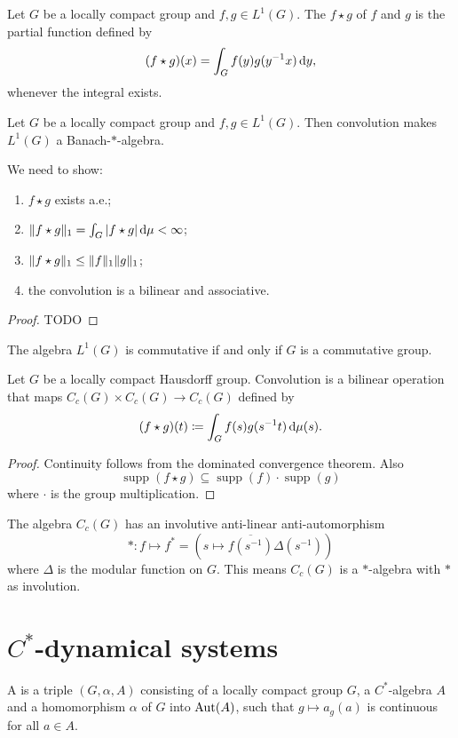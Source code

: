 \begin{definition}
Let $G$ be a locally compact group and $f,g\in L^1(G)$. The  $f\star g$ of $f$ and $g$ is the partial function defined by
\[ (f\star g)(x) = \int_Gf(y)g(y^{-1}x)\operatorname{d \!}{y}, \]
whenever the integral exists.
\end{definition}

\begin{proposition}
Let $G$ be a locally compact group and $f,g\in L^1(G)$. Then convolution makes $L^1(G)$ a Banach-$*$-algebra.
\end{proposition}
We need to show:
\begin{enumerate}
\item $f\star g$ exists a.e.;
\item $\lVert f\star g\rVert_1 = \int_G |f\star g|\operatorname{d \!}{\mu}< \infty$;
\item $\lVert f \star g\rVert_1 \leq \lVert f\rVert_1\lVert g\rVert_1$;
\item the convolution is a bilinear and associative.
\end{enumerate}
\begin{proof}
TODO
\end{proof}

\begin{proposition}
The algebra $L^1(G)$ is commutative \textup{if and only if} $G$ is a commutative group.
\end{proposition}

\begin{lemma}
Let $G$ be a locally compact Hausdorff group. Convolution is a bilinear operation that maps $C_c(G)\times C_c(G)\to C_c(G)$ defined by
\[ (f\star g)(t) \coloneqq \int_Gf(s)g(s^{-1}t)\operatorname{d \!}\mu(s). \]
\end{lemma}
\begin{proof}
Continuity follows from the dominated convergence theorem. Also
\[ \operatorname{supp}(f\star g)\subseteq \operatorname{supp}(f)\cdot\operatorname{supp}(g) \]
where $\cdot$ is the group multiplication.
\end{proof}
\begin{lemma}
The algebra $C_c(G)$ has an involutive anti-linear anti-automorphism
\[ *: f \mapsto f^* = (s\mapsto \overline{f(s^{-1})}\Delta(s^{-1})) \]
where $\Delta$ is the modular function on $G$. This means $C_c(G)$ is a $*$-algebra with $*$ as involution.
\end{lemma}


\section{$C^*$-dynamical systems}
\begin{definition}
A  is a triple $(G,\alpha, A)$ consisting of a locally  
compact group $G$, a $C^*$-algebra $A$ and a homomorphism $\alpha$ of $G$ into $\operatorname{Aut}(A)$, such that $g \mapsto a_g(a)$ is continuous for all $a \in A$. 
\end{definition}

